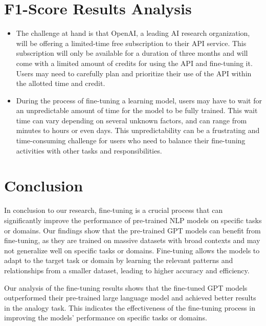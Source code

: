 \documentclass[a0,landscape]{a0poster}
\begin{document}
\begin{multicols}{4}
\color{Teal}
\section*{F1-Score Results Analysis}
\color{Black}


\begin{itemize}
  \item The challenge at hand is that OpenAI, a leading AI research organization, will be offering a limited-time free subscription to their API service. This subscription will only be available for a duration of three months and will come with a limited amount of credits for using the API and fine-tuning it. Users may need to carefully plan and prioritize their use of the API within the allotted time and credit. 
  \item During the process of fine-tuning a learning model, users may have to wait for an unpredictable amount of time for the model to be fully trained. This wait time can vary depending on several unknown factors, and can range from minutes to hours or even days. This unpredictability can be a frustrating and time-consuming challenge for users who need to balance their fine-tuning activities with other tasks and responsibilities.
\end{itemize}



\color{Teal}
\section*{Conclusion}
\color{Black}



In conclusion to our research, fine-tuning is a crucial process that can significantly improve the performance of pre-trained NLP models on specific tasks or domains. Our findings show that the pre-trained GPT models can benefit from fine-tuning, as they are trained on massive datasets with broad contexts and may not generalize well on specific tasks or domains. Fine-tuning allows the models to adapt to the target task or domain by learning the relevant patterns and relationships from a smaller dataset, leading to higher accuracy and efficiency.

\vspace{1cm}
Our analysis of the fine-tuning results shows that the fine-tuned GPT models outperformed their pre-trained large language model and achieved better results in the analogy task. This indicates the effectiveness of the fine-tuning process in improving the models' performance on specific tasks or domains.


\end{multicols}
\end{document}
